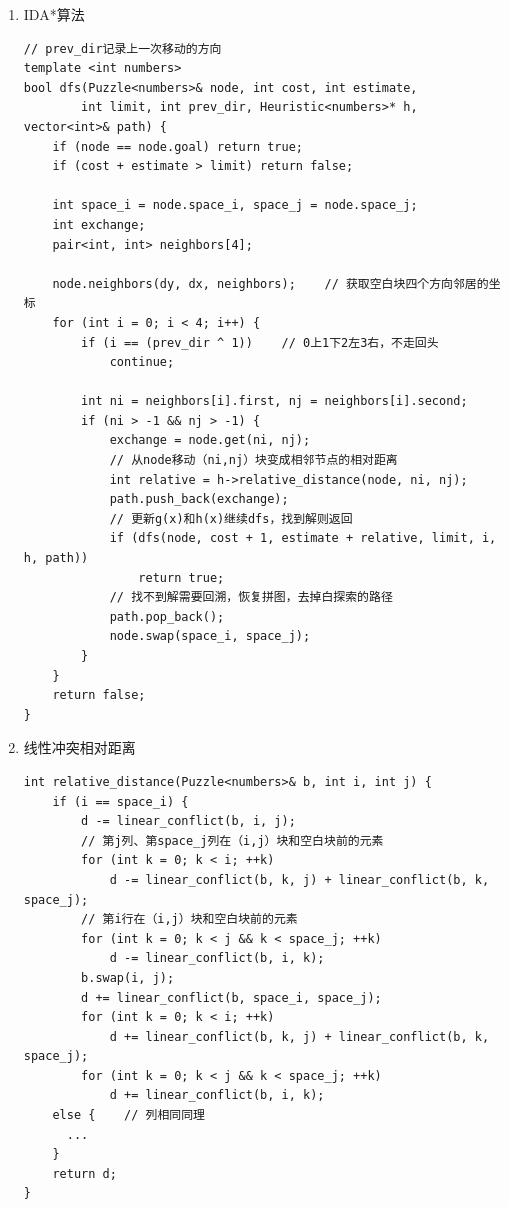 \documentclass[10pt,letterpaper]{ctexart}
\begin{document}
\begin{enumerate}[itemindent=2.5em,label=\arabic*、]
\newpage
\item IDA*算法
\begin{lstlisting}[caption=IDA*-DFS,label={code:IDA*-DFS}]
// prev_dir记录上一次移动的方向
template <int numbers>
bool dfs(Puzzle<numbers>& node, int cost, int estimate,
        int limit, int prev_dir, Heuristic<numbers>* h, vector<int>& path) {
    if (node == node.goal) return true;
    if (cost + estimate > limit) return false;

    int space_i = node.space_i, space_j = node.space_j;
    int exchange;
    pair<int, int> neighbors[4];

    node.neighbors(dy, dx, neighbors);    // 获取空白块四个方向邻居的坐标
    for (int i = 0; i < 4; i++) {
        if (i == (prev_dir ^ 1))    // 0上1下2左3右，不走回头
            continue;

        int ni = neighbors[i].first, nj = neighbors[i].second;
        if (ni > -1 && nj > -1) {
            exchange = node.get(ni, nj);
            // 从node移动（ni,nj）块变成相邻节点的相对距离
            int relative = h->relative_distance(node, ni, nj);
            path.push_back(exchange);
            // 更新g(x)和h(x)继续dfs，找到解则返回
            if (dfs(node, cost + 1, estimate + relative, limit, i, h, path))
                return true;
            // 找不到解需要回溯，恢复拼图，去掉白探索的路径
            path.pop_back();
            node.swap(space_i, space_j);
        }
    }
    return false;
}
\end{lstlisting}

\newpage
\item 线性冲突相对距离
\begin{lstlisting}[caption=线性冲突相对距离,label={code:lc-r}]
int relative_distance(Puzzle<numbers>& b, int i, int j) {
    if (i == space_i) {
        d -= linear_conflict(b, i, j);
        // 第j列、第space_j列在（i,j）块和空白块前的元素
        for (int k = 0; k < i; ++k)
            d -= linear_conflict(b, k, j) + linear_conflict(b, k, space_j);
        // 第i行在（i,j）块和空白块前的元素
        for (int k = 0; k < j && k < space_j; ++k)
            d -= linear_conflict(b, i, k);
        b.swap(i, j);
        d += linear_conflict(b, space_i, space_j);
        for (int k = 0; k < i; ++k)
            d += linear_conflict(b, k, j) + linear_conflict(b, k, space_j);
        for (int k = 0; k < j && k < space_j; ++k)
            d += linear_conflict(b, i, k);
    else {    // 列相同同理
      ...
    }
    return d;
}
\end{lstlisting}
\end{enumerate}
\end{document}
